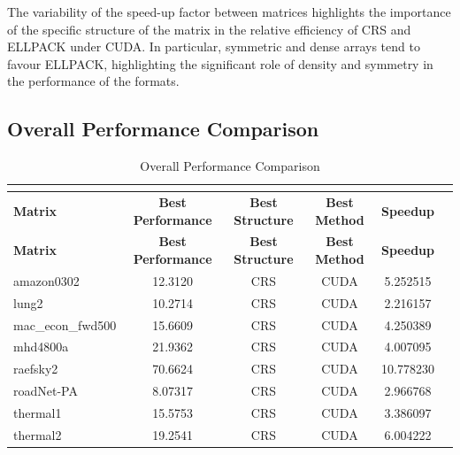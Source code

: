 \documentclass[12pt,oneside]{book} %
\begin{document}
The variability of the speed-up factor between matrices highlights the
importance of the specific structure of the matrix in the relative efficiency
of CRS and ELLPACK under CUDA. In particular, symmetric and dense arrays tend
to favour ELLPACK, highlighting the significant role of density and symmetry in
the performance of the formats.

\subsection{Overall Performance Comparison}

\begin{longtable}{lccccr}
    \caption{Overall Performance Comparison}                                                                          \\
    \label{tab:overallperformance}                                                                                    \\
    \toprule
    \textbf{Matrix}   & \textbf{Best Performance} & \textbf{Best Structure} & \textbf{Best Method} & \textbf{Speedup} \\
    \midrule
    \endfirsthead
    \toprule
    \textbf{Matrix}   & \textbf{Best Performance} & \textbf{Best Structure} & \textbf{Best Method} & \textbf{Speedup} \\
    \midrule
    \endhead
    \bottomrule
    \endfoot
    amazon0302        & 12.3120                   & CRS                     & CUDA                 & 5.252515         \\
    lung2             & 10.2714                   & CRS                     & CUDA                 & 2.216157         \\
    mac\_econ\_fwd500 & 15.6609                   & CRS                     & CUDA                 & 4.250389         \\
    mhd4800a          & 21.9362                   & CRS                     & CUDA                 & 4.007095         \\
    raefsky2          & 70.6624                   & CRS                     & CUDA                 & 10.778230        \\
    roadNet-PA        & 8.07317                   & CRS                     & CUDA                 & 2.966768         \\
    thermal1          & 15.5753                   & CRS                     & CUDA                 & 3.386097         \\
    thermal2          & 19.2541                   & CRS                     & CUDA                 & 6.004222         \\

\end{longtable}
\end{document}
